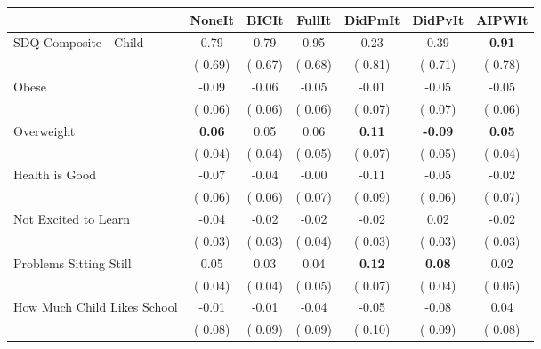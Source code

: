 \begin{tabular}{l c c c c c c}
\toprule
 & NoneIt & BICIt & FullIt & DidPmIt & DidPvIt & AIPWIt \\
\midrule
SDQ Composite - Child &      0.79 &      0.79 &      0.95 &      0.23 &      0.39 & \textbf{     0.91} \\
& (     0.69) & (     0.67) & (     0.68) & (     0.81) & (     0.71) & (     0.78) \\
Obese &     -0.09 &     -0.06 &     -0.05 &     -0.01 &     -0.05 &     -0.05 \\
& (     0.06) & (     0.06) & (     0.06) & (     0.07) & (     0.07) & (     0.06) \\
Overweight & \textbf{      0.06 } &      0.05 &      0.06 & \textbf{      0.11 } & \textbf{     -0.09 } & \textbf{     0.05} \\
& (     0.04) & (     0.04) & (     0.05) & (     0.07) & (     0.05) & (     0.04) \\
Health is Good &     -0.07 &     -0.04 &     -0.00 &     -0.11 &     -0.05 &     -0.02 \\
& (     0.06) & (     0.06) & (     0.07) & (     0.09) & (     0.06) & (     0.07) \\
Not Excited to Learn &     -0.04 &     -0.02 &     -0.02 &     -0.02 &      0.02 &     -0.02 \\
& (     0.03) & (     0.03) & (     0.04) & (     0.03) & (     0.03) & (     0.03) \\
Problems Sitting Still &      0.05 &      0.03 &      0.04 & \textbf{      0.12 } & \textbf{      0.08 } &      0.02 \\
& (     0.04) & (     0.04) & (     0.05) & (     0.07) & (     0.04) & (     0.05) \\
How Much Child Likes School &     -0.01 &     -0.01 &     -0.04 &     -0.05 &     -0.08 &      0.04 \\
& (     0.08) & (     0.09) & (     0.09) & (     0.10) & (     0.09) & (     0.08) \\
\bottomrule
\end{tabular}
